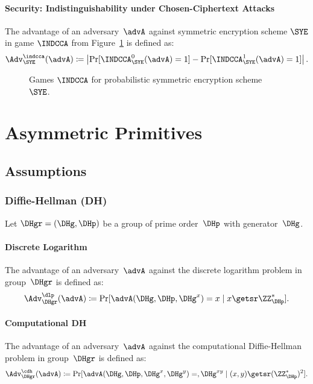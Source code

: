 \documentclass[a4paper,orivec]{llncs}
\begin{document}
\paragraph{Security: Indistinguishability under Chosen-Ciphertext Attacks}
The advantage of an adversary~$\advA$ against symmetric encryption scheme $\SYE$ in game $\INDCCA$ from Figure~\ref{fig:sym:enc:ind:prob} is defined as:
\[
\Adv_\SYE^\indcca(\advA)\coloneqq\left|\Pr[\INDCCA_{\SYE}^0(\advA)=1]-\Pr[\INDCCA_{\SYE}^1(\advA)=1]\right|\text{.}
\]

\begin{figure}[!ht]
    \centering
    \nicoresetlinenr%
    \fbox{%
        \scalebox{\codescalefactor}{%
        }%
    }
    \caption{%
        Games $\INDCCA$ for probabilistic symmetric encryption scheme~$\SYE$.
    }
    \label{fig:sym:enc:ind:prob}
\end{figure}



\section{Asymmetric Primitives}
\label{sec:asym}

\subsection{Assumptions}
\label{sec:asym:assumptions}

\subsubsection{Diffie-Hellman (DH)}
\label{sec:asym:assumptions:dh}
Let $\DHgr=(\DHg,\DHp)$ be a group of prime order~$\DHp$ with generator~$\DHg$.

\paragraph{Discrete Logarithm}
The advantage of an adversary~$\advA$ against the discrete logarithm problem in group~$\DHgr$ is defined as:
\[
\Adv_\DHgr^\dlp(\advA)\coloneqq\Pr[\advA(\DHg,\DHp,\DHg^x)=x\mid x\getsr\ZZ_\DHp^*]\text{.}
\]


\paragraph{Computational DH}
The advantage of an adversary~$\advA$ against the computational Diffie-Hellman problem in group~$\DHgr$ is defined as:
\[
\Adv_\DHgr^\cdh(\advA)\coloneqq\Pr[\advA(\DHg,\DHp,\DHg^x,\DHg^y)=,\DHg^{xy}\mid (x,y)\getsr(\ZZ_\DHp^*)^2]\text{.}
\]
\end{document}
